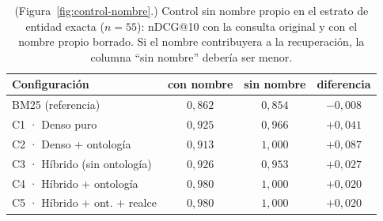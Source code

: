 \documentclass[11pt,letterpaper]{article}
\numberwithin{equation}{section}
\begin{document}
\begin{table}[!htbp]
\centering
\footnotesize
\setlength{\tabcolsep}{5pt}
\renewcommand{\arraystretch}{1.25}
\caption{(Figura~\ref{fig:control-nombre}.) Control sin nombre propio en el estrato de entidad exacta ($n=55$): nDCG@10 con la consulta original y con el nombre propio borrado. Si el nombre contribuyera a la recuperación, la columna ``sin nombre'' debería ser menor.}
\label{tab:control}
\begin{tabularx}{\textwidth}{@{}l C C C@{}}
\toprule
\textbf{Configuración} & \textbf{con nombre} & \textbf{sin nombre} & \textbf{diferencia} \\
\midrule
BM25 (referencia) & $0{,}862$ & $0{,}854$ & $-0{,}008$ \\
C1 · Denso puro & $0{,}925$ & $0{,}966$ & $+0{,}041$ \\
C2 · Denso $+$ ontología & $0{,}913$ & $1{,}000$ & $+0{,}087$ \\
C3 · Híbrido (sin ontología) & $0{,}926$ & $0{,}953$ & $+0{,}027$ \\
C4 · Híbrido $+$ ontología & $0{,}980$ & $1{,}000$ & $+0{,}020$ \\
C5 · Híbrido $+$ ont. $+$ realce & $0{,}980$ & $1{,}000$ & $+0{,}020$ \\
\bottomrule
\end{tabularx}
\end{table}
\end{document}
